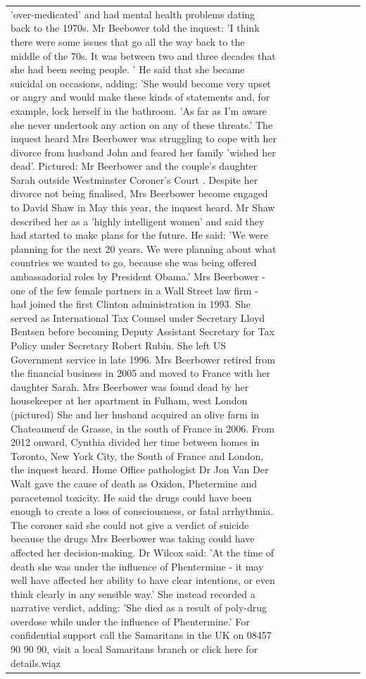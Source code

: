 \begin{table}[H]
\begin{tabular}{lllrlllll}
'over-medicated' and had mental health problems dating back to the 1970s. Mr Beebower told the inquest: 'I think there were some issues that go all the way back to the middle of the 70s. It was between two and three decades that she had been seeing people. ' He said that she became suicidal on occasions, adding: 'She would become very upset or angry and would make these kinds of statements and, for example, lock herself in the bathroom. 'As far as I'm aware she never undertook any action on any of these threats.' The inquest heard Mrs Beerbower was struggling to cope with her divorce from husband John and feared her family 'wished her dead'. Pictured: Mr Beerbower and the couple's daughter Sarah outside Westminster Coroner's Court . Despite her divorce not being finalised, Mrs Beerbower become engaged to David Shaw in May this year, the inquest heard. Mr Shaw described her as a 'highly intelligent women' and said they had started to make plans for the future. He said: 'We were planning for the next 20 years. We were planning about what countries we wanted to go, because she was being offered ambassadorial roles by President Obama.' Mrs Beerbower - one of the few female partners in a Wall Street law firm - had joined the first Clinton administration in 1993. She served as International Tax Counsel under Secretary Lloyd Bentsen before becoming Deputy Assistant Secretary for Tax Policy under Secretary Robert Rubin. She left US Government service in late 1996. Mrs Beerbower retired from the financial business in 2005 and moved to France with her daughter Sarah. Mrs Beerbower was found dead by her housekeeper at her apartment in Fulham, west London (pictured) She and her husband acquired an olive farm in Chateauneuf de Grasse, in the south of France in 2006. From 2012 onward, Cynthia divided her time between homes in Toronto, New York City, the South of France and London, the inquest heard. Home Office pathologist Dr Jon Van Der Walt gave the cause of death as Oxidon, Phetermine and paracetemol toxicity. He said the drugs could have been enough to create a loss of consciousness, or fatal arrhythmia. The coroner said she could not give a verdict of suicide because the drugs Mrs Beerbower was taking could have affected her decision-making. Dr Wilcox said: 'At the time of death she was under the influence of Phentermine - it may well have affected her ability to have clear intentions, or even think clearly in any sensible way.' She instead recorded a narrative verdict, adding: 'She died as a result of poly-drug overdose while under the influence of Phentermine.' For confidential support call the Samaritans in the UK on 08457 90 90 90, visit a local Samaritans branch or click here for details.wiąz \\

\end{tabular}
\end{table}
